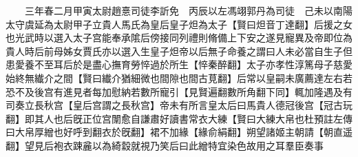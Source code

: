 　　三年春二月甲寅太尉趙憙司徒李訢免　丙辰以左馮翊郭丹為司徒　己未以南陽太守虞延為太尉甲子立貴人馬氏為皇后皇子炟為太子【賢曰炟音丁達翻】后援之女也光武時以選入太子宫能奉承隂后傍接同列禮則脩備上下安之遂見寵異及帝即位為貴人時后前母姊女賈氏亦以選入生皇子炟帝以后無子命養之謂曰人未必當自生子但患愛養不至耳后於是盡心撫育勞悴過於所生【悴秦醉翻】太子亦孝性淳篤母子慈愛始終無纎介之間【賢曰纎介猶細微也間隙也間古莧翻】后常以皇嗣未廣薦達左右若恐不及後宫有進見者每加慰納若數所寵引【見賢遍翻數所角翻下同】輒加隆遇及有司奏立長秋宫【皇后宫謂之長秋宫】帝未有所言皇太后曰馬貴人德冠後宫【冠古玩翻】即其人也后旣正位宫闈愈自謙肅好讀書常衣大練【賢曰大練大帛也杜預註左傳曰大帛厚繒也好呼到翻衣於旣翻】裙不加緣【緣俞絹翻】朔望諸姬主朝請【朝直遥翻】望見后袍衣踈麄以為綺縠就視乃笑后曰此繒特宜染色故用之耳羣臣奏事